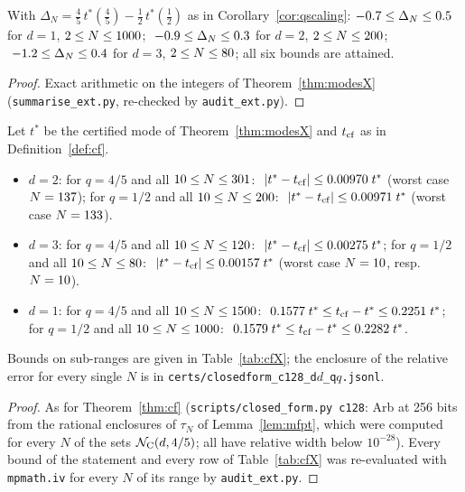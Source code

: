 \begin{corollary}\label{cor:qscalingX}
With $\Delta_N=\tfrac45\,t^*(\tfrac45)-\tfrac12\,t^*(\tfrac12)$ as in Corollary~\ref{cor:qscaling}:
$-0.7\le\Delta_N\le0.5$ for $d=1$, $2\le N\le1000$; $\ -0.9\le\Delta_N\le0.3$ for $d=2$, $2\le N\le200$; $\ -1.2\le\Delta_N\le0.4$ for $d=3$, $2\le N\le80$; all six bounds are attained.
\end{corollary}
\begin{proof}
Exact arithmetic on the integers of Theorem~\ref{thm:modesX} (\texttt{summarise\_ext.py}, re-checked by \texttt{audit\_ext.py}).
\end{proof}

\begin{theorem}\label{thm:cfX}
Let $t^*$ be the certified mode of Theorem~\ref{thm:modesX} and $t_{\rm cf}$ as in Definition~\ref{def:cf}.
\begin{itemize}
\item[(a)] $d=2$: for $q=4/5$ and all $10\le N\le301$\XAlsoTwoF: $\ |t^*-t_{\rm cf}|\le0.00970\;t^*$ (worst case $N=137$); for $q=1/2$ and all $10\le N\le200$\XAlsoTwoH: $\ |t^*-t_{\rm cf}|\le0.00971\;t^*$ (worst case $N=133$).
\item[(b)] $d=3$: for $q=4/5$ and all $10\le N\le120$\XAlsoThreeF: $\ |t^*-t_{\rm cf}|\le0.00275\;t^*$; for $q=1/2$ and all $10\le N\le80$\XAlsoThreeH: $\ |t^*-t_{\rm cf}|\le0.00157\;t^*$ (worst case $N=10$, resp.\ $N=10$).
\item[(c)] $d=1$: for $q=4/5$ and all $10\le N\le1500$\XAlsoOneF: $\ 0.1577\;t^*\le t_{\rm cf}-t^*\le0.2251\;t^*$; for $q=1/2$ and all $10\le N\le1000$\XAlsoOneH: $\ 0.1579\;t^*\le t_{\rm cf}-t^*\le0.2282\;t^*$.
\end{itemize}
Bounds on sub-ranges are given in Table~\ref{tab:cfX}; the enclosure of the relative error for every single $N$ is in \texttt{certs/closedform\_c128\_d$d$\_q$q$.jsonl}.
\end{theorem}
\begin{proof}
As for Theorem~\ref{thm:cf} (\texttt{scripts/closed\_form.py c128}: Arb at 256 bits from the rational enclosures of $\tau_N$ of Lemma~\ref{lem:mfpt}, which were computed for every $N$ of the sets $\mathcal N_{\rm C}(d,4/5)$; all have relative width below $10^{-28}$). Every bound of the statement and every row of Table~\ref{tab:cfX} was re-evaluated with \texttt{mpmath.iv} for every $N$ of its range by \texttt{audit\_ext.py}.
\end{proof}

